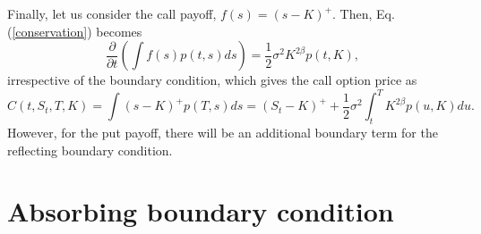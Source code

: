 \documentclass[12pt]{article}
\begin{document}
  Finally, let us consider the call payoff, $f(s)=(s-K)^+$. Then, Eq. (\ref{conservation}) becomes
  \begin{equation}
    \frac{\partial}{\partial t}\left(\int f(s)p(t,s)ds\right) = \frac{1}{2}\sigma^2K^{2\beta}p(t,K),
  \end{equation}
  irrespective of the boundary condition, which gives the call option price as
  \begin{equation}
    C(t,S_t,T,K) = \int (s-K)^+p(T,s)ds = (S_t-K)^++\frac{1}{2}\sigma^2\int_t^T K^{2\beta}p(u,K)du.
    \label{TimeValue}
  \end{equation}
  However, for the put payoff, there will be an additional boundary term for the reflecting boundary condition.



\section{Absorbing boundary condition}
\end{document}
